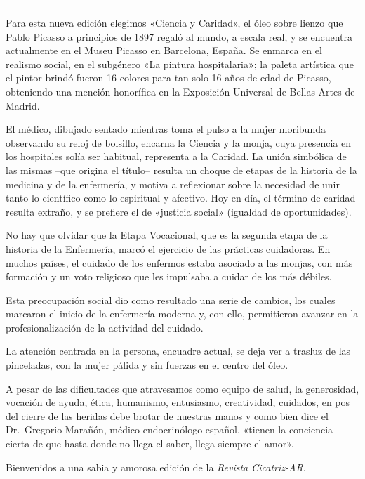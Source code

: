 \documentclass{article}
\begin{document}
\bigskip
\noindent\rule{\linewidth}{0.4pt}
\bigskip

Para esta nueva edición elegimos «Ciencia y Caridad», el óleo sobre lienzo que Pablo Picasso a principios de 1897 regaló al mundo, a escala real, y se encuentra actualmente en el Museu Picasso en Barcelona, España. Se enmarca en el realismo social, en el subgénero «La pintura hospitalaria»; la paleta artística que el pintor brindó fueron 16 colores para tan solo 16 años de edad de Picasso, obteniendo una mención honorífica en la Exposición Universal de Bellas Artes de Madrid.

El médico, dibujado sentado mientras toma el pulso a la mujer moribunda observando su reloj de bolsillo, encarna la Ciencia y la monja, cuya presencia en los hospitales solía ser habitual, representa a la Caridad. La unión simbólica de las mismas –que origina el título– resulta un choque de etapas de la historia de la medicina y de la enfermería, y motiva a reflexionar sobre la necesidad de unir tanto lo científico como lo espiritual y afectivo. Hoy en día, el término de caridad resulta extraño, y se prefiere el de «justicia social» (igualdad de oportunidades).

No hay que olvidar que la Etapa Vocacional, que es la segunda etapa de la historia de la Enfermería, marcó el ejercicio de las prácticas cuidadoras. En muchos países, el cuidado de los enfermos estaba asociado a las monjas, con más formación y un voto religioso que les impulsaba a cuidar de los más débiles.

Esta preocupación social dio como resultado una serie de cambios, los cuales marcaron el inicio de la enfermería moderna y, con ello, permitieron avanzar en la profesionalización de la actividad del cuidado.

La atención centrada en la persona, encuadre actual, se deja ver a trasluz de las pinceladas, con la mujer pálida y sin fuerzas en el centro del óleo.

A pesar de las dificultades que atravesamos como equipo de salud, la generosidad, vocación de ayuda, ética, humanismo, entusiasmo, creatividad, cuidados, en pos del cierre de las heridas debe brotar de nuestras manos y como bien dice el Dr. Gregorio Marañón, médico endocrinólogo español, «tienen la conciencia cierta de que hasta donde no llega el saber, llega siempre el amor».

Bienvenidos a una sabia y amorosa edición de la \emph{Revista Cicatriz-AR}.
\end{document}
